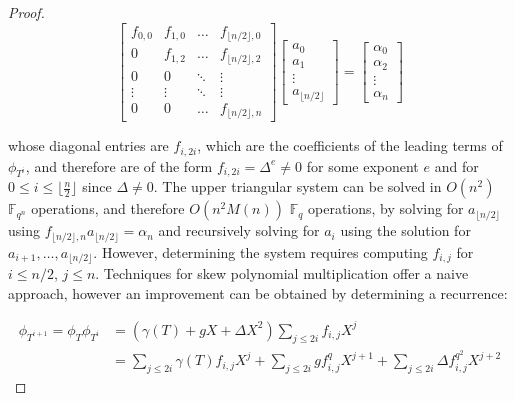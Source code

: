 \documentclass{jams-l}
\theoremstyle{remark}
\numberwithin{equation}{section}
\begin{document}
\begin{proof}
\begin{equation}
\begin{bmatrix} f_{0,0} & f_{1,0} & \ldots & f_{\lfloor n/2 \rfloor, 0} \\
                 0      & f_{1,2} & \ldots & f_{\lfloor n/2 \rfloor, 2}  \\
                 0      & 0       & \ddots & \vdots                      \\
                 \vdots  & \vdots  &  \ddots      & \vdots                       \\
                 0  & 0 & \ldots & f_{\lfloor n/2 \rfloor, n}
\end{bmatrix}
\begin{bmatrix}
a_0 \\ a_1 \\ \vdots \\ a_{\lfloor n/2 \rfloor}
\end{bmatrix} = \begin{bmatrix} \alpha_{0} \\ \alpha_{2} \\ \vdots \\ \alpha_{n} \end{bmatrix}
\end{equation}

\noindent whose diagonal entries are $f_{i,2i}$, which are the coefficients of the leading terms of $\phi_{T^i}$, and therefore are of the form $f_{i,2i} = \Delta^e \neq 0$ for some exponent $e$ and for $0 \leq i \leq \lfloor \frac{n}{2} \rfloor$ since $\Delta \neq 0$. The upper triangular system can be solved in $O(n^2)$ $\mathbb{F}_{q^n}$ operations, and therefore $O(n^2M(n))$ $\mathbb{F}_{q}$ operations, by solving for $a_{\lfloor n/2 \rfloor}$ using $f_{\lfloor n/2 \rfloor, n}a_{\lfloor n/2 \rfloor} = \alpha_{n}$ and recursively solving for $a_i$ using the solution for $a_{i+1}, \ldots, a_{\lfloor n/2 \rfloor}$. However, determining the system requires computing $f_{i,j}$ for $i \leq n/2$, $j \leq n$. Techniques for skew polynomial multiplication offer a naive approach, however an improvement can be obtained by determining a recurrence:

\begin{align*}
 \phi_{T^{i+1}} = \phi_T \phi_{T^i} & = (\gamma(T) + gX + \Delta X^2) \sum_{j \leq 2i} f_{i,j} X^{j} \\
 &= \sum_{j \leq 2i} \gamma(T) f_{i,j} X^{j} + \sum_{j \leq 2i} g f_{i,j}^q X^{j+1} + \sum_{j \leq 2i} \Delta f_{i,j}^{q^2} X^{j+2}
\end{align*}


\end{proof}
\end{document}
